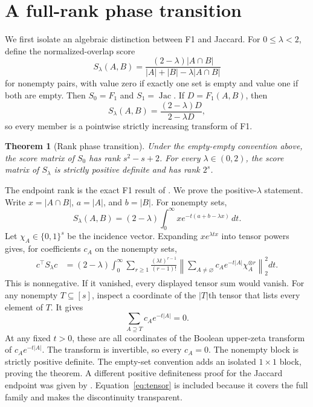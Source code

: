 \documentclass{article}
\newtheorem{theorem}{Theorem}
\newcommand{\1}{\mathbf 1}
\newcommand{\Jac}{\operatorname{Jac}}
\begin{document}
\section{A full-rank phase transition}
\label{sec:rank}

We first isolate an algebraic distinction between F1 and Jaccard. For $0\leq\lambda<2$, define the normalized-overlap score \[ S_\lambda(A,B) =\frac{(2-\lambda)|A\cap B|} {|A|+|B|-\lambda|A\cap B|} \tag{6}\label{eq:family} \] for nonempty pairs, with value zero if exactly one set is empty and value one if both are empty. Then $S_0=F_1$ and $S_1=\Jac$. If $D=F_1(A,B)$, then \[ S_\lambda(A,B)=\frac{(2-\lambda)D}{2-\lambda D}, \tag{7}\label{eq:transform} \] so every member is a pointwise strictly increasing transform of F1.

\begin{theorem}[Rank phase transition]
\label{thm:rank}
Under the empty-empty convention above, the score matrix of $S_0$ has rank $s^2-s+2$. For every $\lambda\in(0,2)$, the score matrix of $S_\lambda$ is strictly positive definite and has rank $2^s$.
\end{theorem}

The endpoint rank is the exact F1 result of \citet{zhang2026exact}. We prove the positive-$\lambda$ statement. Write $x=|A\cap B|$, $a=|A|$, and $b=|B|$. For nonempty sets, \[ S_\lambda(A,B) =(2-\lambda)\int_0^\infty x e^{-t(a+b-\lambda x)}\,dt. \tag{8}\label{eq:integral} \] Let $\chi_A\in\{0,1\}^s$ be the incidence vector. Expanding $x e^{\lambda tx}$ into tensor powers gives, for coefficients $c_A$ on the nonempty sets,
\begin{align}
 c^\top S_\lambda c
 &=(2-\lambda)\int_0^\infty
 \sum_{r\geq1}\frac{(\lambda t)^{r-1}}{(r-1)!}
 \left\|\sum_{A\ne\varnothing}
 c_Ae^{-t|A|}\chi_A^{\otimes r}\right\|_2^2dt.
 \tag{9}\label{eq:tensor}
\end{align}
This is nonnegative. If it vanished, every displayed tensor sum would vanish. For any nonempty $T\subseteq[s]$, inspect a coordinate of the $|T|$th tensor that lists every element of $T$. It gives \[ \sum_{A\supseteq T}c_Ae^{-t|A|}=0. \tag{10}\label{eq:zeta} \] At any fixed $t>0$, these are all coordinates of the Boolean upper-zeta transform of $c_Ae^{-t|A|}$. The transform is invertible, so every $c_A=0$. The nonempty block is strictly positive definite. The empty-set convention adds an isolated $1\times1$ block, proving the theorem. A different positive definiteness proof for the Jaccard endpoint was given by \citet{bouchard2013jaccard}. Equation~\eqref{eq:tensor} is included because it covers the full family and makes the discontinuity transparent.
\end{document}
